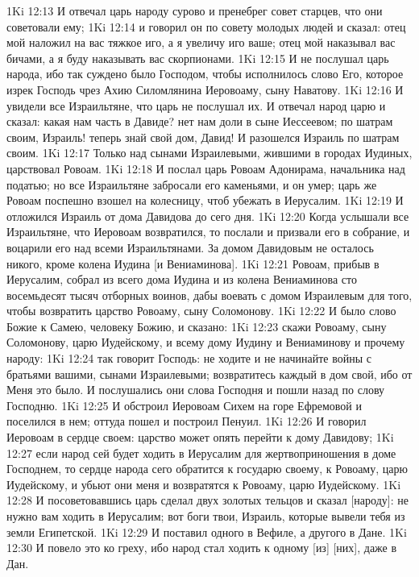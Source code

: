 1Ki 12:13  И отвечал царь народу сурово и пренебрег совет старцев, что они советовали ему;
1Ki 12:14  и говорил он по совету молодых людей и сказал: отец мой наложил на вас тяжкое иго, а я увеличу иго ваше; отец мой наказывал вас бичами, а я буду наказывать вас скорпионами.
1Ki 12:15  И не послушал царь народа, ибо так суждено было Господом, чтобы исполнилось слово Его, которое изрек Господь чрез Ахию Силомлянина Иеровоаму, сыну Наватову.
1Ki 12:16  И увидели все Израильтяне, что царь не послушал их. И отвечал народ царю и сказал: какая нам часть в Давиде? нет нам доли в сыне Иессеевом; по шатрам своим, Израиль! теперь знай свой дом, Давид! И разошелся Израиль по шатрам своим.
1Ki 12:17  Только над сынами Израилевыми, жившими в городах Иудиных, царствовал Ровоам.
1Ki 12:18  И послал царь Ровоам Адонирама, начальника над податью; но все Израильтяне забросали его каменьями, и он умер; царь же Ровоам поспешно взошел на колесницу, чтоб убежать в Иерусалим.
1Ki 12:19  И отложился Израиль от дома Давидова до сего дня.
1Ki 12:20  Когда услышали все Израильтяне, что Иеровоам возвратился, то послали и призвали его в собрание, и воцарили его над всеми Израильтянами. За домом Давидовым не осталось никого, кроме колена Иудина [и Вениаминова].
1Ki 12:21  Ровоам, прибыв в Иерусалим, собрал из всего дома Иудина и из колена Вениаминова сто восемьдесят тысяч отборных воинов, дабы воевать с домом Израилевым для того, чтобы возвратить царство Ровоаму, сыну Соломонову.
1Ki 12:22  И было слово Божие к Самею, человеку Божию, и сказано:
1Ki 12:23  скажи Ровоаму, сыну Соломонову, царю Иудейскому, и всему дому Иудину и Вениаминову и прочему народу:
1Ki 12:24  так говорит Господь: не ходите и не начинайте войны с братьями вашими, сынами Израилевыми; возвратитесь каждый в дом свой, ибо от Меня это было. И послушались они слова Господня и пошли назад по слову Господню.
1Ki 12:25  И обстроил Иеровоам Сихем на горе Ефремовой и поселился в нем; оттуда пошел и построил Пенуил.
1Ki 12:26  И говорил Иеровоам в сердце своем: царство может опять перейти к дому Давидову;
1Ki 12:27  если народ сей будет ходить в Иерусалим для жертвоприношения в доме Господнем, то сердце народа сего обратится к государю своему, к Ровоаму, царю Иудейскому, и убьют они меня и возвратятся к Ровоаму, царю Иудейскому.
1Ki 12:28  И посоветовавшись царь сделал двух золотых тельцов и сказал [народу]: не нужно вам ходить в Иерусалим; вот боги твои, Израиль, которые вывели тебя из земли Египетской.
1Ki 12:29  И поставил одного в Вефиле, а другого в Дане.
1Ki 12:30  И повело это ко греху, ибо народ стал ходить к одному [из] [них], даже в Дан.
